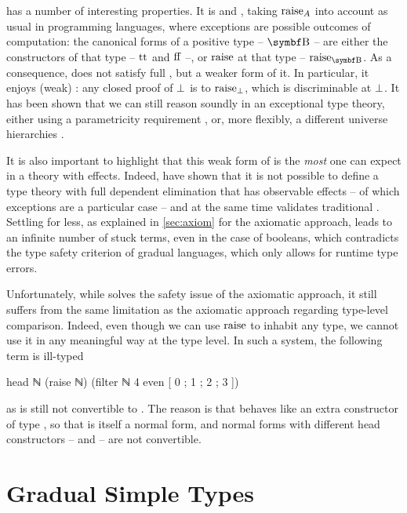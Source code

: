 has a number of interesting properties. It is
 and , taking $\rai[A]$
into account as usual in programming languages,
where exceptions are possible outcomes of computation: the canonical forms
of a positive type – \eg $\Bool$ – are either the
constructors of that type – \eg $\operatorname{tt}$ and $\operatorname{ff}$ –, or
$\rai$ at that type – \eg $\rai[\Bool]$.
%
As a consequence,  does not satisfy full , but
a weaker form of it. In particular, it enjoys
(weak) : any closed proof of $\operatorname{\bot}$ is 
to $\rai[\Empty]$, which is discriminable at $\operatorname{\bot}$.
%
It has been shown that we can still reason soundly in an
exceptional type theory, either using a parametricity
requirement , or, more flexibly, a
different universe hierarchies .

It is also important to highlight that this weak form of  is the \emph{most} one can expect in
a theory with effects. Indeed,  have
shown that it is not possible to define a type theory with full
dependent elimination%
that has observable effects – of which
exceptions are a particular case – and at the same time validates
traditional .
%
Settling for less, as explained in \cref{sec:axiom} for the axiomatic
approach, leads to an infinite number of stuck terms, even in the
case of booleans, which contradicts the type safety criterion of gradual languages,
which only allows for runtime type errors.

Unfortunately, while  solves the safety issue of the axiomatic approach, it still suffers from the same limitation as the axiomatic approach regarding type-level comparison.
Indeed, even though we can use $\rai$ to inhabit any type,
we cannot use it in any meaningful way at the type level.
In such a system, the following term is ill-typed
\begin{coqcode}
  head ℕ (raise ℕ) (filter ℕ 4 even [ 0 ; 1 ; 2 ; 3 ])
\end{coqcode}
as  is still not convertible to
.
The reason is that  behaves like an extra constructor of type , so
that  is itself a normal form,
and normal forms with different head constructors
–  and  – are not convertible.

\section{Gradual Simple Types}
\label{sec:grad-simple}

